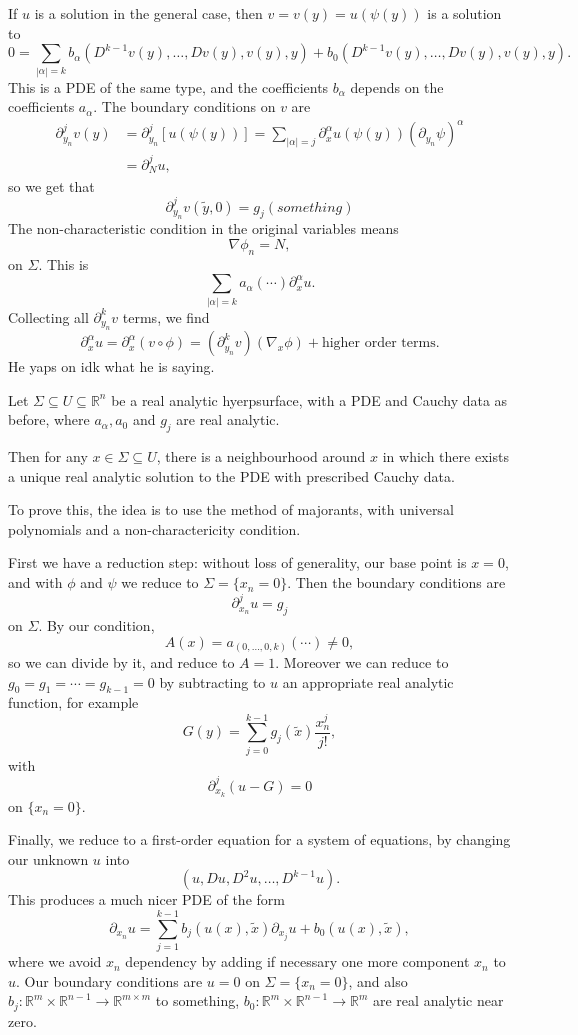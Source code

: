 \documentclass[12pt]{article}
\begin{document}
If $u$ is a solution in the general case, then $v = v(y) = u(\psi(y))$ is a solution to
\[
0 = \sum_{|\alpha| = k} b_\alpha (D^{k-1} v(y), \ldots, D v(y), v(y), y) + b_0 (D^{k-1} v(y), \ldots, D v(y), v(y), y).
\]
This is a PDE of the same type, and the coefficients $b_\alpha$ depends on the coefficients $a_\alpha$. The boundary conditions on $v$ are
\begin{align*}
	\partial^j_{y_n} v(y) &= \partial^j_{y_n} [u(\psi(y))] = \sum_{|\alpha| = j} \partial^\alpha_{x} u(\psi(y))(\partial_{y_n} \psi)^\alpha \\
			      &= \partial^j_N u,
\end{align*}
so we get that
\[
\partial^j_{y_n} v(\tilde y, 0) = g_j(something)
\]
The non-characteristic condition in the original variables means
\[
\nabla \phi_n = N,
\]
on $\Sigma$. This is
\[
\sum_{|\alpha| = k} a_\alpha(\cdots) \partial^\alpha_{x} u.
\]
Collecting all $\partial^k_{y_n} v$ terms, we find
\[
	\partial^\alpha_x u = \partial^\alpha_x(v \circ \phi) = (\partial^k_{y_n} v) (\nabla_x \phi) + \text{higher order terms}.
\]
He yaps on idk what he is saying.

\begin{theorem}
	Let $\Sigma \subseteq U \subseteq \mathbb{R}^n$ be a real analytic hyerpsurface, with a PDE and Cauchy data as before, where $a_\alpha, a_0$ and $g_j$ are real analytic.

	Then for any $x \in \Sigma \subseteq U$, there is a neighbourhood around $x$ in which there exists a unique real analytic solution to the PDE with prescribed Cauchy data.
\end{theorem}

To prove this, the idea is to use the method of majorants, with universal polynomials and a non-charactericity condition.

First we have a reduction step: without loss of generality, our base point is $x = 0$, and with $\phi$ and $\psi$ we reduce to $\Sigma = \{x_n = 0\}$. Then the boundary conditions are
\[
\partial^j_{x_n} u = g_j
\]
on $\Sigma$. By our condition,
\[
A(x) = a_{(0, \ldots, 0, k)} (\cdots) \neq 0,
\]
so we can divide by it, and reduce to $A = 1$. Moreover we can reduce to $g_0 = g_1 = \cdots = g_{k-1} = 0$ by subtracting to $u$ an appropriate real analytic function, for example
\[
G(y) = \sum_{j = 0}^{k-1} g_j(\tilde x) \frac{x_n^j}{j!},
\]
with
\[
\partial^j_{x_k}(u - G) = 0
\]
on $\{x_n = 0\}$.

Finally, we reduce to a first-order equation for a system of equations, by changing our unknown $u$ into
\[
	(u, Du, D^2 u, \ldots, D^{k-1} u).
\]
This produces a much nicer PDE of the form
\[
	\partial_{x_n} u = \sum_{j = 1}^{k-1} b_j (u(x), \tilde x) \partial_{x_j} u + b_0 (u(x), \tilde x),
\]
where we avoid $x_n$ dependency by adding if necessary one more component $x_n$ to $u$. Our boundary conditions are $u = 0$ on $\Sigma = \{x_n = 0\}$, and also $b_j : \mathbb{R}^m \times \mathbb{R}^{n-1} \to \mathbb{R}^{m \times m}$ to something, $b_0 : \mathbb{R}^{m} \times \mathbb{R}^{n-1} \to \mathbb{R}^m$ are real analytic near zero.
\end{document}
